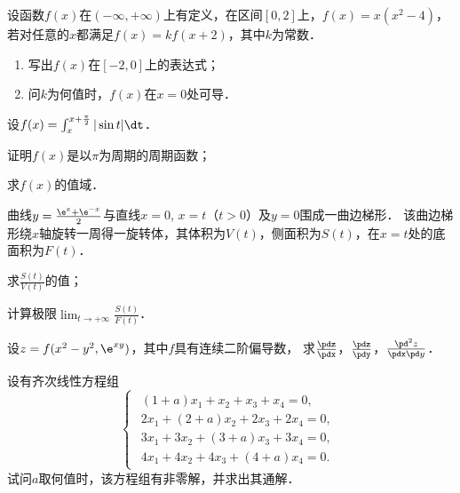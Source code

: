 \documentclass[plain,noanswer,medmath]{../../template/jnuexam}
\begin{document}
\begin{problem}[points=10]
设函数$f(x)$在$(-\infty , +\infty)$上有定义，在区间$[0,2]$上，$f(x) = x(x^2 - 4)$，
若对任意的$x$都满足$f(x) = kf(x + 2)$，其中$k$为常数．
\begin{enumerate}
\item 写出$f(x)$在$[- 2,0]$上的表达式；
\item 问$k$为何值时，$f(x)$在$x = 0$处可导．
\end{enumerate}
\end{problem}


\begin{problem}[points=11]
设$f(x) = \int_x^{x + \frac{\pi}{2}} |\sin t|\dt$．\par
\begin{enumerate*}
\item 证明$f(x)$是以$\pi$为周期的周期函数；
\item 求$f(x)$的值域．
\end{enumerate*}
\end{problem}


\begin{problem}[points=12]
曲线$y = \frac{\e^x + \e^{- x}}{2}$与直线$x = 0$, $x = t$（$t > 0$）及$y = 0$围成一曲边梯形．
该曲边梯形绕$x$轴旋转一周得一旋转体，其体积为$V(t)$，侧面积为$S(t)$，在$x = t$处的底面积为$F(t)$．\par
\begin{enumerate*}
\item 求$\frac{S(t)}{V(t)}$的值；
\item 计算极限$\lim_{t \to +\infty} \frac{S(t)}{F(t)}$．
\end{enumerate*}
\end{problem}






\begin{problem}[points=10]
设$z = f(x^2 - y^2,\e^{xy})$，其中$f$具有连续二阶偏导数，
求$\frac{\pdz}{\pdx}$，$\frac{\pdz}{\pdy}$，$\frac{\pd^2 z}{\pdx\pd y}$．
\end{problem}


\begin{problem}[points=9]%
设有齐次线性方程组
$$\left\{\begin{array}{*{20}{l}}
  \begin{array}{*{20}{l}}
  (1 + a) x_1 + x_2 + x_3 + x_4 = 0, \\
  2x_1 + (2 + a) x_2 + 2x_3 + 2x_4 = 0, \\
  3x_1 + 3x_2 + (3 + a) x_3 + 3x_4 = 0, \\
  4x_1 + 4x_2 + 4x_3 + (4 + a) x_4 = 0.
\end{array}
\end{array} \right.$$
试问$a$取何值时，该方程组有非零解，并求出其通解．
\end{problem}


\end{document}
